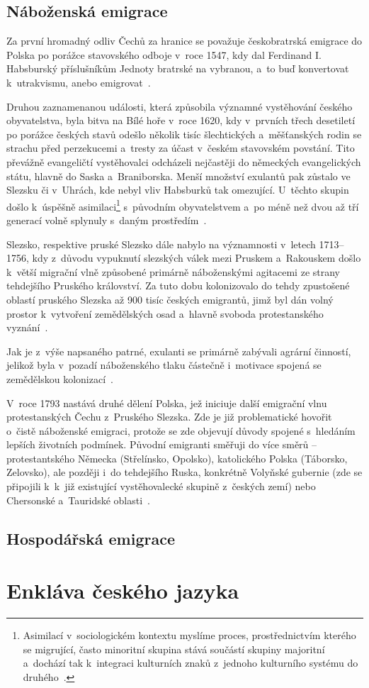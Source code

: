 \hypertarget{nuxe1boux17eenskuxe1-emigrace}{%
\subsection{Náboženská emigrace}\label{nuxe1boux17eenskuxe1-emigrace}}

Za první hromadný odliv Čechů za hranice se považuje českobratrská emigrace do Polska po porážce stavovského odboje v~roce 1547, kdy dal Ferdinand I. Habsburský příslušníkům Jednoty bratrské na vybranou, a~to buď konvertovat k~utrakvismu, anebo emigrovat~\parencite{Vaculik2009a}.

Druhou zaznamenanou události, která způsobila významné vystěhování českého obyvatelstva, byla bitva na Bílé hoře v~roce 1620, kdy v~prvních třech desetiletí po porážce českých stavů odešlo několik tisíc šlechtických a~měšťanských rodin se strachu před perzekucemi a~tresty za účast v~českém stavovském povstání. Tito převážně evangeličtí vystěhovalci odcházeli nejčastěji do německých evangelických státu, hlavně do Saska a~Braniborska. Menší množství exulantů pak zůstalo ve Slezsku či v~Uhrách, kde nebyl vliv Habsburků tak omezující. U~těchto skupin došlo k~úspěšně asimilaci\footnote{Asimilací v~sociologickém kontextu myslíme proces, prostřednictvím kterého se migrující, často minoritní skupina stává součástí skupiny majoritní a~dochází tak k~integraci kulturních znaků z~jednoho kulturního systému do druhého~\parencite{Petrusek2017}.} s~původním obyvatelstvem a~po méně než dvou až tří generací volně splynuly s~daným prostředím~\parencite{Vaculik2002}.

Slezsko, respektive pruské Slezsko dále nabylo na významnosti v~letech 1713--1756, kdy z~důvodu vypuknutí slezských válek mezi Pruskem a~Rakouskem došlo k~větší migrační vlně způsobené primárně náboženskými agitacemi ze strany tehdejšího Pruského království. Za tuto dobu kolonizovalo do tehdy zpustošené oblastí pruského Slezska až 900 tisíc českých emigrantů, jimž byl dán volný prostor k~vytvoření zemědělských osad a~hlavně svoboda protestanského vyznání~\parencite{Vaculik2002}.

Jak je z~výše napsaného patrné, exulanti se primárně zabývali agrární činností, jelikož byla v~pozadí náboženského tlaku částečně i~motivace spojená se zemědělskou kolonizací~\parencite{Broucek2017}.

V~roce 1793 nastává druhé dělení Polska, jež iniciuje další emigrační vlnu protestanských Čechu z~Pruského Slezska. Zde je již problematické hovořit o~čistě náboženské emigraci, protože se zde objevují důvody spojené s~hledáním lepších životních podmínek. Původní emigranti směřuji do více směrů -- protestantského Německa (Střelínsko, Opolsko), katolického Polska (Táborsko, Zelovsko), ale později i~do tehdejšího Ruska, konkrétně Volyňské gubernie (zde se připojili k~k~již existující vystěhovalecké skupině z~českých zemí) nebo Chersonské a~Tauridské oblasti~\parencite{Vaculik2009a}.

\hypertarget{hospoduxe1ux159skuxe1-emigrace}{%
\subsection{Hospodářská emigrace}\label{hospoduxe1ux159skuxe1-emigrace}}

\hypertarget{enkluxe1va-ux10deskuxe9ho-jazyka}{%
\section{Enkláva českého jazyka}\label{enkluxe1va-ux10deskuxe9ho-jazyka}}
